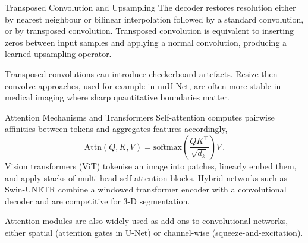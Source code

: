 \begin{frame}{Transposed Convolution and Upsampling}
    The decoder restores resolution either by nearest neighbour or bilinear interpolation followed by a standard convolution, or by transposed convolution. Transposed convolution is equivalent to inserting zeros between input samples and applying a normal convolution, producing a learned upsampling operator.
    \begin{center}
    \end{center}
    Transposed convolutions can introduce checkerboard artefacts. Resize-then-convolve approaches, used for example in nnU-Net, are often more stable in medical imaging where sharp quantitative boundaries matter.
\end{frame}

\begin{frame}{Attention Mechanisms and Transformers}
    Self-attention computes pairwise affinities between tokens and aggregates features accordingly,
    \begin{equation*}
        \mathrm{Attn}(Q, K, V) = \mathrm{softmax}\!\left(\frac{QK^\top}{\sqrt{d_k}}\right) V\,.
    \end{equation*}
    Vision transformers (ViT) tokenise an image into patches, linearly embed them, and apply stacks of multi-head self-attention blocks. Hybrid networks such as Swin-UNETR combine a windowed transformer encoder with a convolutional decoder and are competitive for 3-D segmentation.

    Attention modules are also widely used as add-ons to convolutional networks, either spatial (attention gates in U-Net) or channel-wise (squeeze-and-excitation).
\end{frame}

